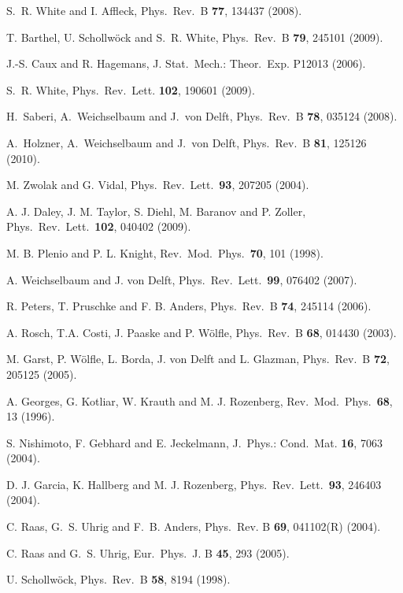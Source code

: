 S.~R. White and I. Affleck,
Phys.\ Rev.\ B {\bf 77}, 134437 (2008).

T. Barthel, U. Schollw\"{o}ck and S.~R. White, Phys.\ Rev.\ B {\bf 79}, 245101 (2009).

J.-S. Caux and R. Hagemans, J. Stat.\ Mech.: Theor.\ Exp. P12013 (2006).

S.~R. White,
Phys.\ Rev.\ Lett. {\bf 102}, 190601 (2009).

H.~Saberi, A.~Weichselbaum and J.~von Delft, Phys.\ Rev.\ B {\bf 78}, 035124 (2008).

A.~Holzner, A.~Weichselbaum and J.~von Delft, Phys.\ Rev.\ B {\bf 81}, 125126 (2010).

M. Zwolak and G. Vidal,  Phys.\ Rev.\ Lett.\ {\bf 93}, 207205 (2004).

A. J. Daley, J. M. Taylor, S. Diehl, M. Baranov and P. Zoller, Phys.\ Rev.\ Lett.\ {\bf 102}, 040402 (2009).

M. B. Plenio and P. L. Knight, Rev.\ Mod.\ Phys.\ {\bf 70}, 101 (1998).

A. Weichselbaum and J. von Delft, Phys.\ Rev.\ Lett.\ {\bf 99}, 076402 (2007).

 R. Peters, T. Pruschke and F. B. Anders, Phys.\ Rev.\ B {\bf 74}, 245114 (2006).

A. Rosch, T.A. Costi, J. Paaske and P. W\"{o}lfle, Phys.\ Rev.\ B {\bf 68}, 014430 (2003).

M. Garst, P. W\"{o}lfle, L. Borda, J. von Delft and L. Glazman, Phys.\ Rev.\ B {\bf 72}, 205125 (2005).

 A. Georges, G. Kotliar, W. Krauth and M. J. Rozenberg, Rev.\ Mod.\ Phys.\ {\bf 68}, 13 (1996).

 S. Nishimoto, F. Gebhard and E. Jeckelmann, J.\ Phys.: Cond.\ Mat. {\bf 16}, 7063 (2004).

 D. J. Garcia, K. Hallberg and M. J. Rozenberg, Phys.\ Rev.\ Lett.\ {\bf 93}, 246403 (2004). 

C. Raas, G.~S. Uhrig and F.~B. Anders, Phys.\ Rev. B {\bf 69}, 041102(R) (2004).

C. Raas and G.~S. Uhrig, Eur.\ Phys.\ J. B {\bf 45}, 293 (2005).

U. Schollw\"{o}ck, Phys.\ Rev.\ B {\bf 58}, 8194 (1998).

